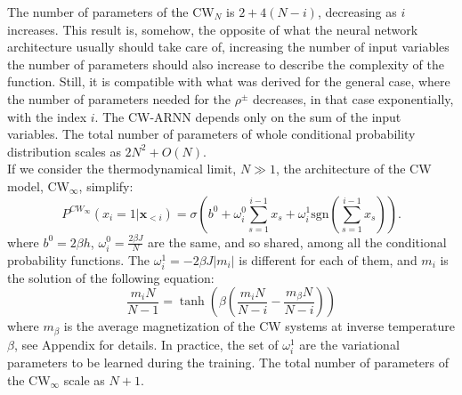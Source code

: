 \documentclass[aps,physrev,10pt,floatfix,reprint]{revtex4-2}
\begin{document}
The number of parameters of the CW$_N$ is $2+4(N-i)$, decreasing as $i$ increases. This result is, somehow, the opposite of what the neural network architecture usually should take care of, increasing the number of input variables the number of parameters should also increase to describe the complexity of the function. Still, it is compatible with what was derived for the general case, where the number of parameters needed for the $\rho^{\pm}$ decreases, in that case exponentially, with the index $i$. The CW-ARNN depends only on the sum of the input variables.
The total number of parameters of whole conditional probability distribution scales as $2N^2+ O(N)$. \\
If we consider the thermodynamical limit, $N \gg 1$, the architecture of the CW model, CW$_{\infty}$, simplify:
\begin{equation*}
    P^{CW_{\infty}}\left(x_{i}=1|\mathbf{x}_{<i}\right) =  \sigma \left(b^0+\omega_{i}^0\sum_{s=1}^{i-1}x_{s} + \omega_i^1 \text{sgn}(\sum_{s=1}^{i-1}x_{s})\right).
\end{equation*}
where $b^0=2\beta h$, $\omega^0_i = \frac{2\beta J}{N}$ are the same, and so shared, among all the conditional probability functions. The $\omega^1_i = -2\beta J |m_i|$ is different for each of them, and $m_i$ is the solution of the following equation:
\begin{equation}
    \frac{m_i N}{N-1} = \tanh \left( \beta(\frac{m_i N}{N - i} - \frac{m_{\beta}N}{N-i}) \right)
    \label{eq:extrem_i}
    \end{equation}
where $m_{\beta}$ is the average magnetization of the CW systems at inverse temperature $\beta$, see Appendix for details. In practice, the set of $\omega^1_i$ are the variational parameters to be learned during the training. The total number of parameters of the CW$_{\infty}$ scale as $N+1$.
    
\end{document}
